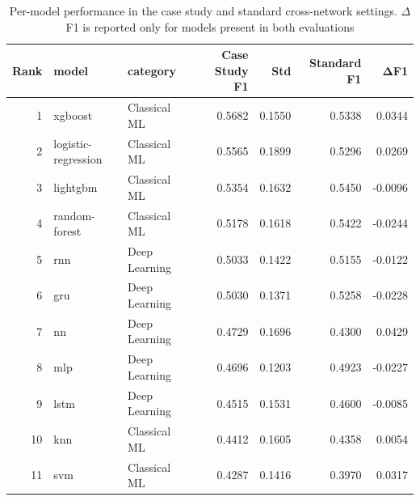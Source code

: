 \begin{table}
\caption{Per-model performance in the case study and standard cross-network settings. $\Delta$F1 is reported only for models present in both evaluations}
\label{tab:q6_models}
\begin{tabular}{rllrrrr}
\toprule
Rank & model & category & Case Study F1 & Std & Standard F1 & ΔF1 \\
\midrule
1 & xgboost & Classical ML & 0.5682 & 0.1550 & 0.5338 & 0.0344 \\
2 & logistic-regression & Classical ML & 0.5565 & 0.1899 & 0.5296 & 0.0269 \\
3 & lightgbm & Classical ML & 0.5354 & 0.1632 & 0.5450 & -0.0096 \\
4 & random-forest & Classical ML & 0.5178 & 0.1618 & 0.5422 & -0.0244 \\
5 & rnn & Deep Learning & 0.5033 & 0.1422 & 0.5155 & -0.0122 \\
6 & gru & Deep Learning & 0.5030 & 0.1371 & 0.5258 & -0.0228 \\
7 & nn & Deep Learning & 0.4729 & 0.1696 & 0.4300 & 0.0429 \\
8 & mlp & Deep Learning & 0.4696 & 0.1203 & 0.4923 & -0.0227 \\
9 & lstm & Deep Learning & 0.4515 & 0.1531 & 0.4600 & -0.0085 \\
10 & knn & Classical ML & 0.4412 & 0.1605 & 0.4358 & 0.0054 \\
11 & svm & Classical ML & 0.4287 & 0.1416 & 0.3970 & 0.0317 \\
\bottomrule
\end{tabular}
\end{table}
